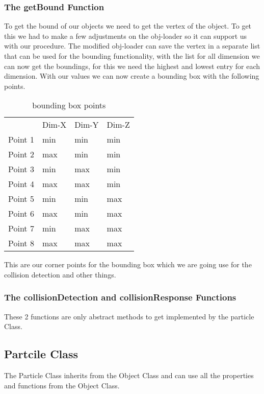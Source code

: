 \documentclass{sig-alternate-05-2015}
\begin{document}
\subsubsection{The getBound Function}
To get the bound of our objects we need to get the vertex of the object. To get this we had to make a few adjustments on the obj-loader so it can support us with our procedure. The modified obj-loader can save the vertex in a separate list that can be used for the bounding functionality, with the list for all dimension we can now get the boundings, for this we need the highest and lowest entry for each dimension. With our values we can now create a bounding box with the following points.
\begin{table}[!htbp]
\centering
\begin{tabular}{llll}
        & Dim-X & Dim-Y & Dim-Z \\
Point 1 & min   & min   & min   \\
Point 2 & max   & min   & min   \\
Point 3 & min   & max   & min   \\
Point 4 & max   & max   & min   \\
Point 5 & min   & min   & max   \\
Point 6 & max   & min   & max   \\
Point 7 & min   & max   & max   \\
Point 8 & max   & max   & max  
\end{tabular}
\caption{bounding box points}
\label{my-label}
\end{table}
This are our corner points for the bounding box which we are going use for the collision detection and other things.
\subsubsection{The collisionDetection and collisionResponse Functions}
These 2 functions are only abstract methods to get implemented by the particle Class.\\
\subsection{Partcile Class}
The Particle Class inherits from the Object Class and can use all the properties and functions from the Object Class.
\end{document}
